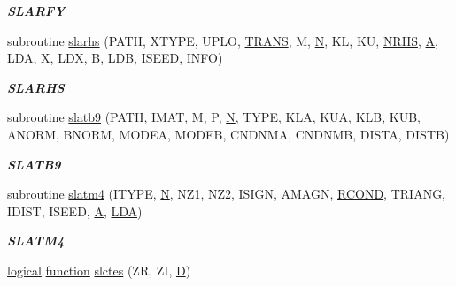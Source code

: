 \begin{DoxyCompactItemize}
\begin{DoxyCompactList}\small\item\em {\bfseries S\+L\+A\+R\+F\+Y} \end{DoxyCompactList}\item 
subroutine \hyperlink{group__single__eig_ga67befe1509ef6eaf403bedf1c4bf4058}{slarhs} (P\+A\+T\+H, X\+T\+Y\+P\+E, U\+P\+L\+O, \hyperlink{superlu__enum__consts_8h_a0c4e17b2d5cea33f9991ccc6a6678d62a1f61e3015bfe0f0c2c3fda4c5a0cdf58}{T\+R\+A\+N\+S}, M, \hyperlink{polmisc_8c_a0240ac851181b84ac374872dc5434ee4}{N}, K\+L, K\+U, \hyperlink{example__user_8c_aa0138da002ce2a90360df2f521eb3198}{N\+R\+H\+S}, \hyperlink{classA}{A}, \hyperlink{example__user_8c_ae946da542ce0db94dced19b2ecefd1aa}{L\+D\+A}, X, L\+D\+X, B, \hyperlink{example__user_8c_a50e90a7104df172b5a89a06c47fcca04}{L\+D\+B}, I\+S\+E\+E\+D, I\+N\+F\+O)
\begin{DoxyCompactList}\small\item\em {\bfseries S\+L\+A\+R\+H\+S} \end{DoxyCompactList}\item 
subroutine \hyperlink{group__single__eig_ga9540564c76aed17bc8b26a879ee5ca46}{slatb9} (P\+A\+T\+H, I\+M\+A\+T, M, P, \hyperlink{polmisc_8c_a0240ac851181b84ac374872dc5434ee4}{N}, T\+Y\+P\+E, K\+L\+A, K\+U\+A, K\+L\+B, K\+U\+B, A\+N\+O\+R\+M, B\+N\+O\+R\+M, M\+O\+D\+E\+A, M\+O\+D\+E\+B, C\+N\+D\+N\+M\+A, C\+N\+D\+N\+M\+B, D\+I\+S\+T\+A, D\+I\+S\+T\+B)
\begin{DoxyCompactList}\small\item\em {\bfseries S\+L\+A\+T\+B9} \end{DoxyCompactList}\item 
subroutine \hyperlink{group__single__eig_gae46d8275d9069151d2cf111296204a54}{slatm4} (I\+T\+Y\+P\+E, \hyperlink{polmisc_8c_a0240ac851181b84ac374872dc5434ee4}{N}, N\+Z1, N\+Z2, I\+S\+I\+G\+N, A\+M\+A\+G\+N, \hyperlink{superlu__enum__consts_8h_af00a42ecad444bbda75cde1b64bd7e72a9b5c151728d8512307565994c89919d5}{R\+C\+O\+N\+D}, T\+R\+I\+A\+N\+G, I\+D\+I\+S\+T, I\+S\+E\+E\+D, \hyperlink{classA}{A}, \hyperlink{example__user_8c_ae946da542ce0db94dced19b2ecefd1aa}{L\+D\+A})
\begin{DoxyCompactList}\small\item\em {\bfseries S\+L\+A\+T\+M4} \end{DoxyCompactList}\item 
\hyperlink{tnc_8c_aa7b64cdf39500931f7b333343791a104}{logical} \hyperlink{afunc_8m_a7b5e596df91eadea6c537c0825e894a7}{function} \hyperlink{group__single__eig_ga895e457eb85e862c2a2caa9f12c060e2}{slctes} (Z\+R, Z\+I, \hyperlink{odrpack_8h_a7dae6ea403d00f3687f24a874e67d139}{D})

\end{DoxyCompactItemize}
